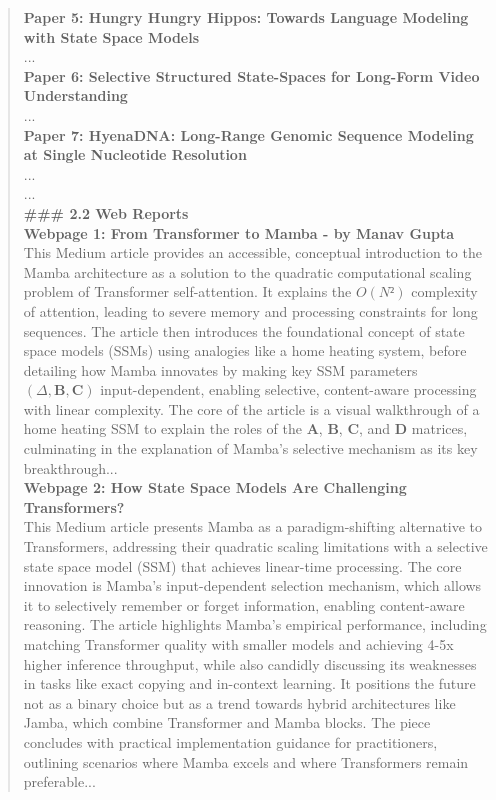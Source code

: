\begin{quote}
\begin{tcolorbox}[breakable,colback=almond!20!white, colframe=almond!60!black, title=\textbf{Case Study (Mamba: Linear-Time Sequence Modeling with Selective State Spaces)}]
        \textbf{Paper 5: Hungry Hungry Hippos: Towards Language Modeling with State Space Models}\\
        ...\\

        \textbf{Paper 6: Selective Structured State-Spaces for Long-Form Video Understanding}\\
        ...\\

        \textbf{Paper 7: HyenaDNA: Long-Range Genomic Sequence Modeling at Single Nucleotide Resolution}\\
        ...\\
        ...\\

        \textbf{\#\#\# 2.2 Web Reports}\\

        \textbf{Webpage 1:  From Transformer to Mamba - by Manav Gupta}\\
        This Medium article provides an accessible, conceptual introduction to the Mamba architecture as a solution to the quadratic computational scaling problem of Transformer self-attention. It explains the $O(N²)$ complexity of attention, leading to severe memory and processing constraints for long sequences. The article then introduces the foundational concept of state space models (SSMs) using analogies like a home heating system, before detailing how Mamba innovates by making key SSM parameters $(\Delta, \boldsymbol{B}, \boldsymbol{C})$ input-dependent, enabling selective, content-aware processing with linear complexity. The core of the article is a visual walkthrough of a home heating SSM to explain the roles of the $\boldsymbol{A}$, $\boldsymbol{B}$, $\boldsymbol{C}$, and $\boldsymbol{D}$ matrices, culminating in the explanation of Mamba's selective mechanism as its key breakthrough...\\

        \textbf{Webpage 2: How State Space Models Are Challenging Transformers?}\\
        This Medium article presents Mamba as a paradigm-shifting alternative to Transformers, addressing their quadratic scaling limitations with a selective state space model (SSM) that achieves linear-time processing. The core innovation is Mamba's input-dependent selection mechanism, which allows it to selectively remember or forget information, enabling content-aware reasoning. The article highlights Mamba's empirical performance, including matching Transformer quality with smaller models and achieving 4-5x higher inference throughput, while also candidly discussing its weaknesses in tasks like exact copying and in-context learning. It positions the future not as a binary choice but as a trend towards hybrid architectures like Jamba, which combine Transformer and Mamba blocks. The piece concludes with practical implementation guidance for practitioners, outlining scenarios where Mamba excels and where Transformers remain preferable...\\


\end{tcolorbox}
\end{quote}
